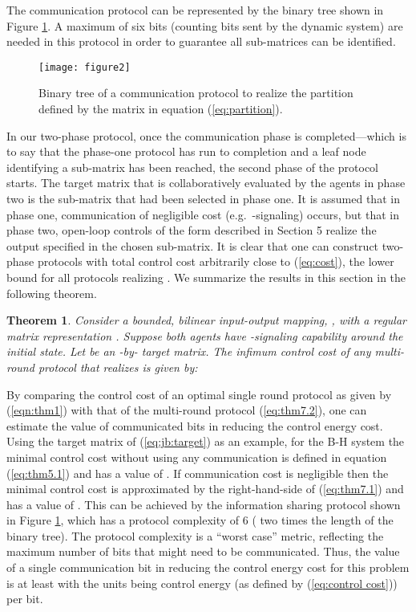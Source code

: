 \documentclass[12pt,onecolumn,draftcls]{IEEEtran}
\newtheorem{theorem}{Theorem}[section]
\begin{document}
The communication protocol can be represented by the binary tree shown in Figure \ref{fig1}.
A maximum of six bits (counting bits sent by the dynamic system) are needed in this protocol
in order to guarantee all sub-matrices can be identified. 

\begin{figure}[h] \begin{center}
\vspace{-.1cm}
\texttt{[image: figure2]} 
\vspace{-0.8cm}
\caption{Binary tree of a communication protocol to realize the partition
defined by the matrix in equation (\ref{eq:partition}).}  \label{fig1}
\end{center}
\end{figure}

In our two-phase protocol, once the communication phase is completed---which is to say that the phase-one protocol has run to completion and a leaf node identifying a sub-matrix has been reached, the second phase of the protocol starts.  The target matrix that is collaboratively evaluated by the agents in phase two is the sub-matrix that had been selected in phase one.  It is assumed that in phase one, communication of negligible cost (e.g.\ -signaling) occurs, but that in phase two, open-loop controls of the form described in Section 5 realize the output specified in the chosen sub-matrix.
It is clear that one can construct two-phase protocols with total control cost arbitrarily
close to (\ref{eq:cost}), the lower bound for all protocols realizing .		
We summarize the results in this section in the following theorem.

\begin{theorem}
\label{thm:3}
Consider a bounded, bilinear input-output mapping, , with a regular matrix representation .
Suppose both agents have -signaling capability around the initial state.
Let  be an -by- target matrix.
The infimum control cost of any multi-round protocol that realizes  is given by:

\end{theorem}

By comparing the control cost of an optimal single round protocol as given by (\ref{eqn:thm1}) with that of the multi-round protocol (\ref{eq:thm7.2}), one
can estimate the value of  communicated bits in reducing the control energy cost.  
Using the target matrix  of (\ref{eq:jb:target}) as an example, for the B-H system the minimal control cost without using any communication is defined in equation (\ref{eq:thm5.1}) and has a value of  .  If
communication cost is negligible then the minimal control cost is approximated by the right-hand-side of (\ref{eq:thm7.1}) and has a value of .  This can be achieved by the information sharing protocol shown in Figure \ref{fig1}, which has a protocol complexity of 6 ( two times the length of the binary tree).  The protocol complexity is a ``worst case'' metric, reflecting the maximum number of bits that might need to be communicated.  Thus, the value of a single communication bit in reducing the control energy cost for this problem is at least  with the units being control energy (as defined by (\ref{eq:control cost})) per bit.
\end{document}
